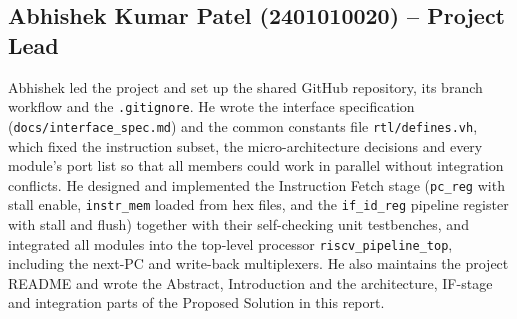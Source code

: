 
\subsection{Abhishek Kumar Patel (2401010020) -- Project Lead}

Abhishek led the project and set up the shared GitHub repository, its branch workflow and the
\texttt{.gitignore}. He wrote the interface specification (\texttt{docs/interface\_spec.md}) and the
common constants file \texttt{rtl/defines.vh}, which fixed the instruction subset, the
micro-architecture decisions and every module's port list so that all members could work in
parallel without integration conflicts. He designed and implemented the Instruction Fetch stage
(\texttt{pc\_reg} with stall enable, \texttt{instr\_mem} loaded from hex files, and the
\texttt{if\_id\_reg} pipeline register with stall and flush) together with their self-checking
unit testbenches, and integrated all modules into the top-level processor
\texttt{riscv\_pipeline\_top}, including the next-PC and write-back multiplexers. He also maintains
the project README and wrote the Abstract, Introduction and the architecture, IF-stage and
integration parts of the Proposed Solution in this report.
